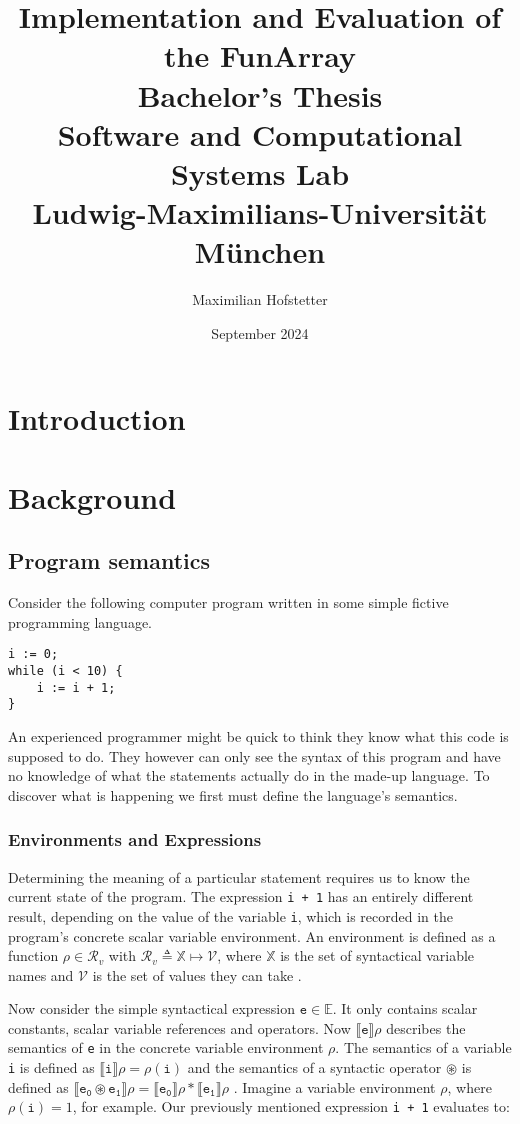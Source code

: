 \documentclass{report}
\title{Implementation and Evaluation of the FunArray\\[1em]\large{}Bachelor's Thesis\\[1em]Software and Computational Systems Lab\\Ludwig-Maximilians-Universit\"at M\"unchen}
\date{September 2024}
\author{Maximilian Hofstetter}
\begin{document}
\maketitle

\chapter{Introduction}
\chapter{Background}
\section{Program semantics}

Consider the following computer program written in some simple fictive programming language.

\begin{center}
\begin{BVerbatim}
i := 0;
while (i < 10) {
    i := i + 1;
}
\end{BVerbatim}
\end{center}

An experienced programmer might be quick to think they know what this code is supposed to do. They however can only see the syntax of this program and have no knowledge of what the statements actually do in the made-up language. To discover what is happening we first must define the language's semantics. 


\subsection{Environments and Expressions}

Determining the meaning of a particular statement requires us to know the current state of the program. The expression \texttt{i + 1} has an entirely different result, depending on the value of the variable \texttt{i}, which is recorded in the program's concrete scalar variable environment. An environment is defined as a function $\rho\in\mathcal{R}_v$ with $\mathcal{R}_v \triangleq \mathbb{X}\mapsto\mathcal{V}$, where $\mathbb{X}$ is the set of syntactical variable names and $\mathcal{V}$ is the set of values they can take \cite{cousot2011}.

Now consider the simple syntactical expression $\mathtt{e}\in\mathbb{E}$. It only contains scalar constants, scalar variable references and operators. Now $\llbracket\mathtt{e}\rrbracket\rho$ describes the semantics of \texttt{e} in the concrete variable environment $\rho$. The semantics of a variable \texttt{i} is defined as $\llbracket\mathtt{i}\rrbracket\rho=\rho(\mathtt{i})$ and the semantics of a syntactic operator $\circledast$ is defined as $\llbracket\mathtt{e_0\circledast e_1}\rrbracket\rho=\llbracket\mathtt{e_0}\rrbracket\rho \ast\llbracket\mathtt{e_1}\rrbracket\rho$ \cite{scott1971}. 
Imagine a variable environment $\rho$, where $\rho(\mathtt{i})=1$, for example. Our previously mentioned expression \texttt{i + 1} evaluates to:
\end{document}
